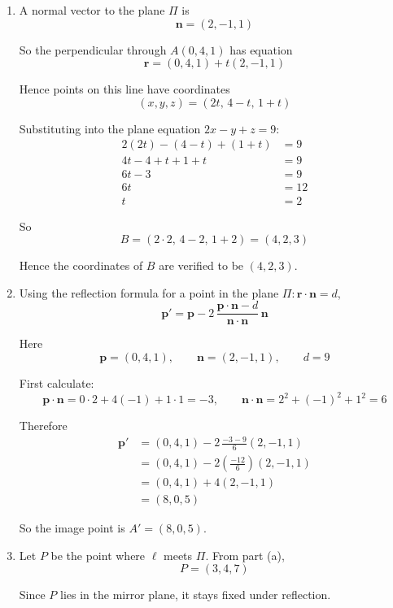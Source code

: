 \documentclass[leqno]{article}
\begin{document}
\begin{enumerate}[
  label=\textbf{\arabic*.},
  leftmargin=*,
  topsep=0pt,
  partopsep=0pt,
  parsep=0pt
]
\begin{tcolorbox}[colback=white, colframe=scarlet, title={\textbf{Solution}}, breakable, grow to left by=6mm, grow to right by=10mm]
\begin{enumerate}[label=\textbf{(\alph*)}]
  Hence the point of intersection is
  \[
  (x,y,z)=(1+2,\,2\cdot 2,\,1+3\cdot 2)=(3,4,7)
  \]

  Therefore, the line \(\ell\) meets the plane \(\Pi\) at \((3,4,7)\).

  \item A normal vector to the plane \(\Pi\) is
  \[
  \mathbf n=(2,-1,1)
  \]

  So the perpendicular through \(A(0,4,1)\) has equation
  \[
  \mathbf r=(0,4,1)+t(2,-1,1)
  \]

  Hence points on this line have coordinates
  \[
  (x,y,z)=(2t,\,4-t,\,1+t)
  \]

  Substituting into the plane equation \(2x-y+z=9\):
  \begin{align*}
  2(2t)-(4-t)+(1+t)&=9\\
  4t-4+t+1+t&=9\\
  6t-3&=9\\
  6t&=12\\
  t&=2
  \end{align*}

  So
  \[
  B=(2\cdot 2,\,4-2,\,1+2)=(4,2,3)
  \]

  Hence the coordinates of \(B\) are verified to be \((4,2,3)\).

  \item Using the reflection formula for a point in the plane \(\Pi:\mathbf r\cdot\mathbf n=d\),
  \[
  \mathbf p'
  =\mathbf p-2\,\frac{\mathbf p\cdot\mathbf n-d}{\mathbf n\cdot\mathbf n}\,\mathbf n
  \]

  Here
  \[
  \mathbf p=(0,4,1),\qquad \mathbf n=(2,-1,1),\qquad d=9
  \]

  First calculate:
  \[
  \mathbf p\cdot\mathbf n=0\cdot 2+4(-1)+1\cdot 1=-3,
  \qquad
  \mathbf n\cdot\mathbf n=2^2+(-1)^2+1^2=6
  \]

  Therefore
  \begin{align*}
  \mathbf p'
  &=(0,4,1)-2\,\frac{-3-9}{6}(2,-1,1)\\
  &=(0,4,1)-2\left(\frac{-12}{6}\right)(2,-1,1)\\
  &=(0,4,1)+4(2,-1,1)\\
  &=(8,0,5)
  \end{align*}

  So the image point is \(A'=(8,0,5)\).

  \item Let \(P\) be the point where \(\ell\) meets \(\Pi\). From part (a),
  \[
  P=(3,4,7)
  \]

  Since \(P\) lies in the mirror plane, it stays fixed under reflection.


\end{enumerate}
\end{tcolorbox}
\end{enumerate}
\end{document}
